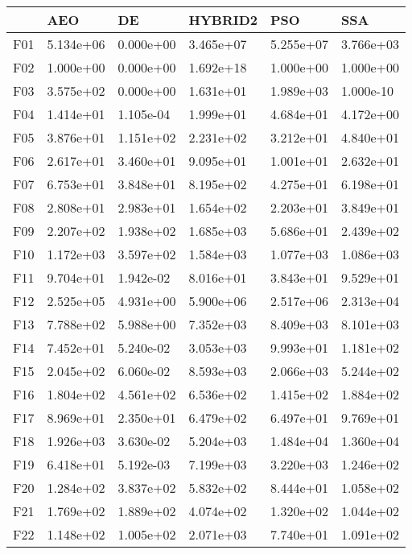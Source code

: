 \begin{tabular}{llllll}
\toprule
{} &        AEO &         DE &    HYBRID2 &        PSO &        SSA \\
\midrule
F01  &  5.134e+06 &  0.000e+00 &  3.465e+07 &  5.255e+07 &  3.766e+03 \\
F02  &  1.000e+00 &  0.000e+00 &  1.692e+18 &  1.000e+00 &  1.000e+00 \\
F03  &  3.575e+02 &  0.000e+00 &  1.631e+01 &  1.989e+03 &  1.000e-10 \\
F04  &  1.414e+01 &  1.105e-04 &  1.999e+01 &  4.684e+01 &  4.172e+00 \\
F05  &  3.876e+01 &  1.151e+02 &  2.231e+02 &  3.212e+01 &  4.840e+01 \\
F06  &  2.617e+01 &  3.460e+01 &  9.095e+01 &  1.001e+01 &  2.632e+01 \\
F07  &  6.753e+01 &  3.848e+01 &  8.195e+02 &  4.275e+01 &  6.198e+01 \\
F08  &  2.808e+01 &  2.983e+01 &  1.654e+02 &  2.203e+01 &  3.849e+01 \\
F09  &  2.207e+02 &  1.938e+02 &  1.685e+03 &  5.686e+01 &  2.439e+02 \\
F10  &  1.172e+03 &  3.597e+02 &  1.584e+03 &  1.077e+03 &  1.086e+03 \\
F11  &  9.704e+01 &  1.942e-02 &  8.016e+01 &  3.843e+01 &  9.529e+01 \\
F12  &  2.525e+05 &  4.931e+00 &  5.900e+06 &  2.517e+06 &  2.313e+04 \\
F13  &  7.788e+02 &  5.988e+00 &  7.352e+03 &  8.409e+03 &  8.101e+03 \\
F14  &  7.452e+01 &  5.240e-02 &  3.053e+03 &  9.993e+01 &  1.181e+02 \\
F15  &  2.045e+02 &  6.060e-02 &  8.593e+03 &  2.066e+03 &  5.244e+02 \\
F16  &  1.804e+02 &  4.561e+02 &  6.536e+02 &  1.415e+02 &  1.884e+02 \\
F17  &  8.969e+01 &  2.350e+01 &  6.479e+02 &  6.497e+01 &  9.769e+01 \\
F18  &  1.926e+03 &  3.630e-02 &  5.204e+03 &  1.484e+04 &  1.360e+04 \\
F19  &  6.418e+01 &  5.192e-03 &  7.199e+03 &  3.220e+03 &  1.246e+02 \\
F20  &  1.284e+02 &  3.837e+02 &  5.832e+02 &  8.444e+01 &  1.058e+02 \\
F21  &  1.769e+02 &  1.889e+02 &  4.074e+02 &  1.320e+02 &  1.044e+02 \\
F22  &  1.148e+02 &  1.005e+02 &  2.071e+03 &  7.740e+01 &  1.091e+02 \\

\end{tabular}
